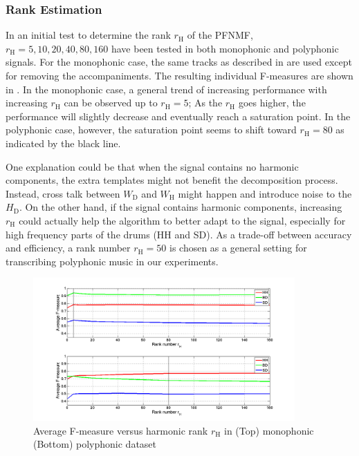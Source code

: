\documentclass{article}
\begin{document}
\subsubsection{Rank Estimation}\label{rank}
In an initial test to determine the rank $r_\mathrm{H}$ of the PFNMF, $r_\mathrm{H} = {5, 10, 20, 40, 80, 160}$ have been tested in both monophonic and polyphonic signals. For the monophonic case, the same tracks as described in  are used except for removing the accompaniments. The resulting individual F-measures are shown in . In the monophonic case, a general trend of increasing performance with increasing $r_\mathrm{H}$ can be observed up to $r_\mathrm{H} = 5$; As the $r_\mathrm{H}$ goes higher, the performance will slightly decrease and eventually reach a saturation point. In the polyphonic case, however, the saturation point seems to shift toward $r_\mathrm{H} = 80$ as indicated by the black line. 

One explanation could be that when the signal contains no harmonic components, the extra templates might not benefit the decomposition process. Instead, cross talk between $W_\mathrm{D}$ and $W_\mathrm{H}$ might happen and introduce noise to the $H_\mathrm{D}$. On the other hand, if the signal contains harmonic components, increasing $r_\mathrm{H}$ could actually help the algorithm to better adapt to the signal, especially for high frequency parts of the drums (HH and SD). As a trade-off between accuracy and efficiency, a rank number $r_\mathrm{H} = 50$ is chosen as a general setting for transcribing polyphonic music in our experiments.

\begin{figure}
 \centerline{
 \includegraphics[width=10cm]{testOnK_mono_poly.png}}
 \caption{Average F-measure versus harmonic rank $r_\mathrm{H}$ in (Top) monophonic (Bottom) polyphonic dataset}%
 \label{fig:rankTest}
\end{figure}
\end{document}
